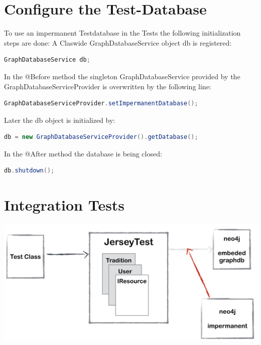 \documentclass[11pt,fleqn,openany]{book} %
\begin{document}

\chapter{Configure the Test-Database}

To use an impermanent Testdatabase in the Tests the following initialization steps are done:
A Claswide GraphDatabaseService object db is registered:

\begin{lstlisting}[language=java]
    GraphDatabaseService db;
\end{lstlisting}
In the @Before method the singleton GraphDatabaseService provided by the GraphDatabaseServiceProvider is overwritten by the following line:

\begin{lstlisting}[language=java]
    GraphDatabaseServiceProvider.setImpermanentDatabase();
\end{lstlisting}
Later the db object is initialized by:
\begin{lstlisting}[language=java]
    db = new GraphDatabaseServiceProvider().getDatabase();
\end{lstlisting}
In the @After method the database is being closed:
\begin{lstlisting}[language=java]
    db.shutdown();
\end{lstlisting}



\chapter{Integration Tests}

\begin{center}
\includegraphics[scale=.4]{Pictures/jerseytestoverview.png} 
\end{center}
\end{document}
